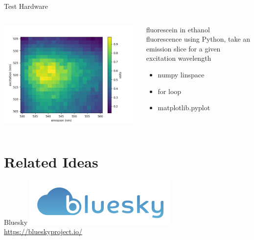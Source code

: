 \documentclass{presentation}
\begin{document}
\begin{frame}{Test Hardware}
  \begin{columns}
    \begin{column}{0.6\textwidth}
      \includegraphics[width=\textwidth]{./2d-pl.png}
    \end{column}
    \begin{column}{0.4\textwidth}
      fluorescein in ethanol \\
      fluorescence
      \vfill
      using Python, take an emission slice for a given excitation wavelength
      \begin{itemize}
        \item{numpy linspace}
        \item{for loop}
        \item{matplotlib.pyplot}
      \end{itemize}
    \end{column}
  \end{columns}
\end{frame}

\section{Related Ideas}

\begin{frame}{Bluesky}
  \center
  \includegraphics[width=\textwidth]{./bluesky-logo.png}
  \url{https://blueskyproject.io/}
\end{frame}
\end{document}
